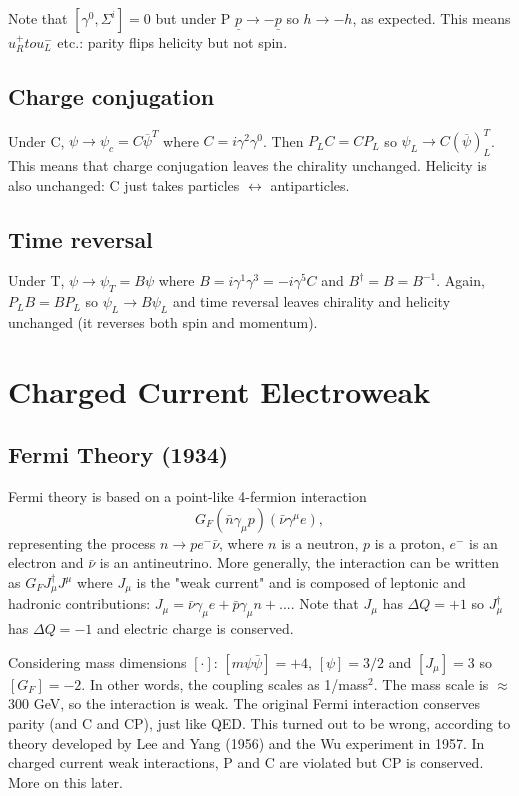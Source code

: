 \documentclass[a4paper,12pt]{article}
\begin{document}
Note that $[\gamma^0, \Sigma^i] = 0$ but under P $\underline{p} \to - \underline{p}$ so $h \to -h$, as expected. This means $u_R^+ to u_L^-$ etc.: parity flips helicity but not spin.
%
\subsection{Charge conjugation}
%
Under C, $\psi \to \psi_c = C\overline{\psi}^T$ where $C = i\gamma^2\gamma^0$. Then $P_LC = CP_L$ so $\psi_L \to C(\overline{\psi})_L^T$. 
This means that charge conjugation leaves the chirality unchanged. Helicity is also unchanged: C just takes particles $\leftrightarrow$ antiparticles.
%
\subsection{Time reversal}
%
Under T, $\psi \to \psi_T = B\psi$ where $B = i\gamma^1\gamma^3 = -i\gamma^5C$ and $B^\dagger = B = B^{-1}$. Again, $P_LB = BP_L$ so $\psi_L \to B\psi_L$ and time reversal leaves chirality and helicity unchanged (it reverses both spin and momentum). 
%
\newpage
%
\section{Charged Current Electroweak}
%
\subsection{Fermi Theory (1934)}
%
Fermi theory is based on a point-like 4-fermion interaction
\begin{equation}
    G_F(\bar{n}\gamma_\mu p)(\bar{\nu}\gamma^\mu e),
\end{equation}
representing the process $n \to pe^-\bar{\nu}$, where $n$ is a neutron, $p$ is a proton, $e^-$ is an electron and $\bar{\nu}$ is an antineutrino. More generally, the interaction can be written as $G_F J_\mu^\dagger J^\mu$ where $J_\mu$ is the "weak current" and is composed of leptonic and hadronic contributions: $J_\mu = \bar{\nu}\gamma_\mu e + \bar{p}\gamma_\mu n + ...$. Note that $J_\mu$ has $\Delta Q = +1$ so $J_\mu^\dagger$ has $\Delta Q = -1$ and electric charge is conserved. 

Considering mass dimensions $[\cdot]$: $[m\psi\bar{\psi}]=+4$, $[\psi]=3/2$ and $[J_\mu] =3$ so $[G_F]=-2$. In other words, the coupling scales as 1/mass$^2$. The mass scale is $\approx$ 300 GeV, so the interaction is weak. The original Fermi interaction conserves parity (and C and CP), just like QED. This turned out to be wrong, according to theory developed by Lee and Yang (1956) and the Wu experiment in 1957. In charged current weak interactions, P and C are violated but CP is conserved. More on this later.
%
\end{document}
